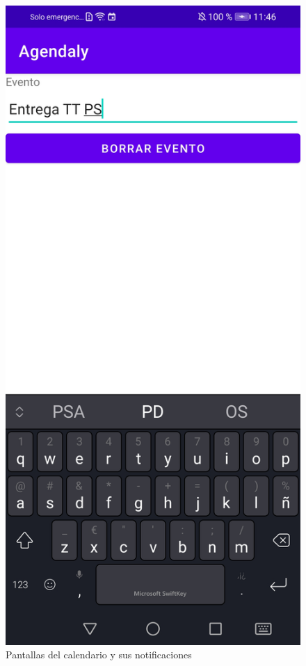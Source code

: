 \documentclass[a4paper,openright,12pt]{article}
\begin{document}
\begin{figure}
            \includegraphics[scale=0.05]{calendar6.jpg}\hfill
            \caption{Pantallas del calendario y sus notificaciones}
        \end{figure}
\end{document}
